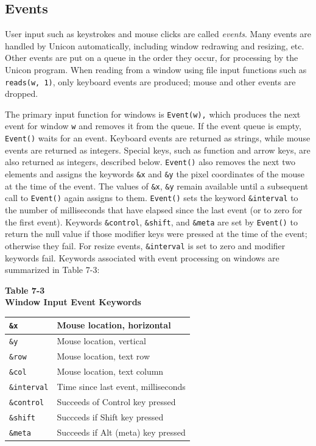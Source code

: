 \subsection{Events}

User input such as keystrokes and mouse clicks are called
\textit{events}. Many events are handled by Unicon automatically,
including window redrawing and resizing, etc.  Other events are put on
a queue in the order they occur, for processing by the Unicon
program. When reading from a window using file input functions such as
\texttt{reads(w, 1)}, only keyboard events are produced; mouse and
other events are dropped.

The primary input function for windows is \texttt{Event(w),} which
produces the next event for window \texttt{w} and removes it from the
queue. If the event queue is empty, \texttt{Event()} waits for an
event. Keyboard events are returned as strings, while mouse events are
returned as integers. Special keys, such as function and arrow keys,
are also returned as integers, described below. \texttt{Event()} also
removes the next two elements and assigns the keywords \texttt{\&x}
and \texttt{\&y} the pixel coordinates of the mouse at the time of the
event. The values of \texttt{\&x}, \texttt{\&y} remain available until
a subsequent call to \texttt{Event()} again assigns to them.
\texttt{Event()} sets the keyword \texttt{\&interval} to the number of
milliseconds that have elapsed since the last event (or to zero for
the first event). Keywords \texttt{\&control}, \texttt{\&shift}, and
\texttt{\&meta} are set by \texttt{Event()} to return the null value
if those modifier keys were pressed at the time of the event;
otherwise they fail. For resize events, \texttt{\&interval} is set to
zero and modifier keywords fail. Keywords associated with event
processing on windows are summarized in Table 7-3:

\begin{center}
{\sffamily\bfseries Table 7-3} \\
{\sffamily\bfseries Window Input Event Keywords}

\begin{supertabular}{|m{0.90in}|m{2.7in}|}
\texttt{\&x} &
Mouse location, horizontal\\\hline
\texttt{\&y} &
Mouse location, vertical\\\hline
\texttt{\&row} &
Mouse location, text row\\\hline
\texttt{\&col} &
Mouse location, text column\\\hline
\texttt{\&interval} &
Time since last event, milliseconds\\\hline
\texttt{\&control} &
Succeeds of Control key pressed\\\hline
\texttt{\&shift} &
Succceds if Shift key pressed\\\hline
\texttt{\&meta} &
Succeeds if Alt (meta) key pressed\\\hline
\end{supertabular}
\end{center}

